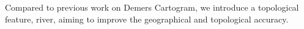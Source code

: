 


Compared to previous work on Demers Cartogram, we introduce a topological feature, river, aiming to improve the geographical and topological accuracy.